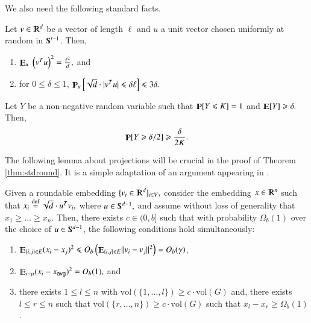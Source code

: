 \documentclass[twoside,leqno,twocolumn]{article}
\renewcommand{\mathbb}{\varmathbb}
\renewcommand{\leq}{\leqslant}
\renewcommand{\geq}{\geqslant}
\newcommand{\abs}[1]{\lvert#1\rvert}
\newcommand{\norm}[1]{\lVert#1\rVert}
\newcommand{\vol}{\mathrm{vol}}
\newcommand{\defeq}{\stackrel{\textup{def}}{=}}
\newcommand{\R}{\mathbb R}
\newcommand{\Esymb}{\mathbb{E}}
\newcommand{\Psymb}{\mathbb{P}}
\DeclareMathOperator*{\E}{\Esymb}
\DeclareMathOperator*{\ProbOp}{\Psymb}
\renewcommand{\Pr}{\ProbOp}
\numberwithin{equation}{section}
\newcommand{\avg}{{\ensuremath{\mathsf{avg}}\xspace}}
\begin{document}
We also need the following standard facts.
\begin{fact}\label{fct:prob}
Let $v \in \R^d$ be a vector of length $\ell$ and $u$ a unit vector chosen uniformly at random in $\mathbb{S}^{t-1}$. Then,
\begin{enumerate}
\item $\E_u \; \left(v^T u\right)^2 = \frac{\ell^2}{d},$ and 
\item  for $0 \leq \delta \leq 1$,
$\Pr_u \left[ \sqrt{d} \cdot \abs{v^T u} \leq \delta \ell \right] \leq 3\delta.$
\end{enumerate}
\end{fact}




\begin{fact}\label{fct:antimarkov}
Let $Y$ be a non-negative random variable such that $\Pr [Y \leq K] =1$  and $\E[Y] \geq \delta.$ Then,   
$$\Pr[Y \geq \delta/2] \geq \frac{\delta }{2K }.$$  
\end{fact}





The following lemma about projections will be crucial in the proof of Theorem \ref{thm:stdround}. It is a simple adaptation of an argument appearing in \cite{ARV}.
\begin{lemma}[Projection]\label{lem:projection}
Given a roundable embedding $\{v_i \in \R^d\}_{i\in V},$  consider the embedding $x \in \R^n$ such that $x_i \defeq  \sqrt{d} \cdot  {u^T v_i},$ where $u \in \mathbb{S}^{d-1},$ and assume without loss of generality that $x_1 \geq \ldots \geq  x_n.$    Then, there exists  $c \in (0,b]$ such that with  probability $\Omega_b(1)$ over the choice of $u \in \mathbb{S}^{d-1}$, the following conditions hold simultaneously:
\begin{enumerate}
\item $\E_{\{i,j\} \in E} (x_i - x_j)^2 \leq O_b\left(\E_{\{i,j\} \in E} \norm{v_i - v_j}^2 \right) = O_b (\gamma)$,
\item $\E_{i \sim \mu} (x_i - x_\avg)^2 = O_b(1),$ and 
\item there exists $1\leq l\leq n$ with $\vol(\{1,\ldots,l\}) \geq c\cdot \vol(G)$ and, there exists $l \leq r \leq n$ such that $\vol(\{r, \ldots, n\}) \geq c\cdot  \vol(G)$ such that $x_l - x_r \geq \Omega_b(1)$.
\end{enumerate}
\end{lemma}
\end{document}
